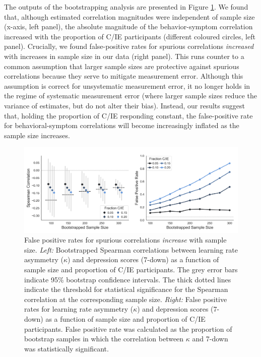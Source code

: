 \documentclass[a4paper,notitlepage,12pt]{article}
\begin{document}
The outputs of the bootstrapping analysis are presented in Figure \ref{fig:bootstrap}. We found that, although estimated correlation magnitudes were independent of sample size (x-axis, left panel), the absolute magnitude of the behavior-symptom correlation increased with the proportion of C/IE participants (different coloured circles, left panel). Crucially, we found false-positive rates for spurious correlations \emph{increased} with increases in sample size in our data (right panel). This runs counter to a common assumption that larger sample sizes are protective against spurious correlations because they serve to mitigate measurement error. Although this assumption is correct for unsystematic measurement error, it no longer holds in the regime of systematic measurement error (where larger sample sizes reduce the variance of estimates, but do not alter their bias). Instead, our results suggest that, holding the proportion of C/IE responding constant, the false-positive rate for behavioral-symptom correlations will become increasingly inflated as the sample size increases.

\begin{figure}[!t]
\includegraphics[width=16cm]{../figures/main_03b.png}
\centering
\captionsetup{width=0.88\textwidth}
\caption{False positive rates for spurious correlations \emph{increase} with sample size. \textit{Left:} Bootstrapped Spearman correlations between learning rate asymmetry ($\kappa$) and depression scores (7-down) as a function of sample size and proportion of C/IE participants. The grey error bars indicate 95\% bootstrap confidence intervals. The thick dotted lines indicate the threshold for statistical significance for the Spearman correlation at the corresponding sample size. \textit{Right:} False positive rates for learning rate asymmetry ($\kappa$) and depression scores (7-down) as a function of sample size and proportion of C/IE participants. False positive rate was calculated as the proportion of bootstrap samples in which the correlation between $\kappa$ and 7-down was statistically significant.}
\label{fig:bootstrap}
\end{figure}
\end{document}
